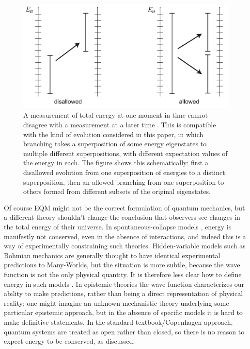 \documentclass[aps,prd,onecolumn,nofootinbib,notitlepage]{revtex4-1}
\begin{document}
\begin{figure}[h]
\centering
\includegraphics[width=.6\textwidth]{allowed.pdf}
\caption{A measurement of total energy at one moment in time cannot disagree with a measurement at a later time \cite{griffiths,hartle1995conservation}.
This is compatible with the kind of evolution considered in this paper, in which branching takes a superposition of some energy eigenstates to multiple different superpositions, with different expectation values of the energy in each.
The figure shows this schematically: first a disallowed evolution from one superposition of energies to a distinct superposition, then an allowed branching from one superposition to others formed from different subsets of the original eigenstates.}
\label{fig:allowed}
\end{figure}

Of course EQM might not be the correct formulation of quantum mechanics, but a different theory shouldn't change the conclusion that observers see changes in the total energy of their universe.
In spontaneous-collapse models \cite{Ghirardi:1985mt,Pearle:1988uh,Ghirardi:1989cn}, energy is manifestly not conserved, even in the absence of interactions, and indeed this is a way of experimentally constraining such theories.
Hidden-variable models such as Bohmian mechanics \cite{duerr2009bohmian} are generally thought to have identical experimental predictions to Many-Worlds, but the situation is more subtle, because the wave function is not the only physical quantity.
It is therefore less clear how to define energy in such models \cite{Maudlin:2019bje}.
In epistemic theories \cite{leifer2014quantum} the wave function characterizes our ability to make predictions, rather than being a direct representation of physical reality; one might imagine an unknown mechanistic theory underlying some particular epistemic approach, but in the absence of specific models it is hard to make definitive statements.
In the standard textbook/Copenhagen approach, quantum systems are treated as open rather than closed, so there is no reason to expect energy to be conserved, as discussed.
\end{document}
